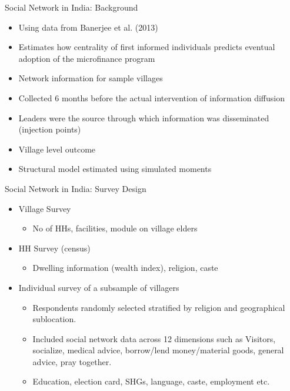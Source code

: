 \documentclass[newPxFont,numfooter,sectionpages]{beamer}
\begin{document}
\begin{frame}{Social Network in India: Background}

	\begin{itemize}
		\item Using data from Banerjee et al. (2013)
		\item Estimates how centrality of first informed individuals predicts eventual adoption of the microfinance program
		\item Network information for sample villages
		\item Collected 6 months before the actual intervention of information diffusion
		\item Leaders were the source through which information was disseminated (injection points)
		\item Village level outcome
		\item Structural model estimated using simulated moments
	\end{itemize}

\end{frame}

\begin{frame}{Social Network in India: Survey Design}

	\begin{itemize}
		\item Village Survey 
		\begin{itemize}
			\item No of HHs, facilities, module on village elders
		\end{itemize}		
		
		\item HH Survey (census)
		\begin{itemize}
			\item Dwelling information (wealth index), religion, caste
		\end{itemize}		

		\item Individual survey of a subsample of villagers
		\begin{itemize}
			\item Respondents randomly selected stratified by religion and geographical sublocation. 
			\item Included social network data across 12 dimensions such as Visitors, socialize, medical advice, borrow/lend money/material goods, general advice, pray together.
			\item Education, election card, SHGs, language, caste, employment etc. 
		\end{itemize}		

	\end{itemize}

\end{frame}
\end{document}
